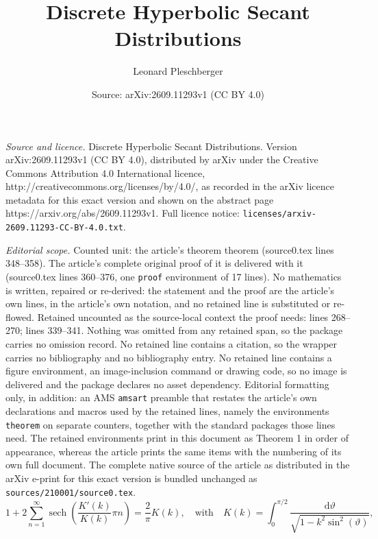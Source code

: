 \documentclass[10pt,a4paper]{amsart}
\title{Discrete Hyperbolic Secant Distributions}
\author{Leonard Pleschberger}
\date{Source: arXiv:2609.11293v1 (CC BY 4.0)}
\begin{document}
\maketitle

\noindent\emph{Source and licence.} Discrete Hyperbolic Secant Distributions. Version arXiv:2609.11293v1 (CC BY 4.0), distributed by arXiv under the Creative Commons Attribution 4.0 International licence, http://creativecommons.org/licenses/by/4.0/, as recorded in the arXiv licence metadata for this exact version and shown on the abstract page https://arxiv.org/abs/2609.11293v1. Full licence notice: \texttt{licenses/arxiv-2609.11293-CC-BY-4.0.txt}.\par\smallskip

\noindent\textit{Editorial scope.} Counted unit: the article's theorem theorem (source0.tex lines 348--358). The article's complete original proof of it is delivered with it (source0.tex lines 360--376, one \texttt{proof} environment of 17 lines). No mathematics is written, repaired or re-derived: the statement and the proof are the article's own lines, in the article's own notation, and no retained line is substituted or re-flowed.  Retained uncounted as the source-local context the proof needs: lines 268--270; lines 339--341.  Nothing was omitted from any retained span, so the package carries no omission record.  No retained line contains a citation, so the wrapper carries no bibliography and no bibliography entry.  No retained line contains a figure environment, an image-inclusion command or drawing code, so no image is delivered and the package declares no asset dependency.  Editorial formatting only, in addition: an AMS \texttt{amsart} preamble that restates the article's own declarations and macros used by the retained lines, namely the environments \texttt{theorem} on separate counters, together with the standard packages those lines need.  The retained environments print in this document as Theorem 1 in order of appearance, whereas the article prints the same items with the numbering of its own full document.  The complete native source of the article as distributed in the arXiv e-print for this exact version is bundled unchanged as \texttt{sources/210001/source0.tex}.
\begin{equation}\label{form:ramanujan_1}
1 + 2 \sum_{n=1}^\infty \operatorname{sech}\left(\frac{K'(k)}{K(k)} \pi n\right) = \frac{2}{\pi} K(k), \quad \mathrm{with} \quad K(k) = \int_0^{\pi/2} \frac{\mathrm{d}\vartheta}{\sqrt{1-k^2\sin^2(\vartheta)}},
\end{equation}
\end{document}

